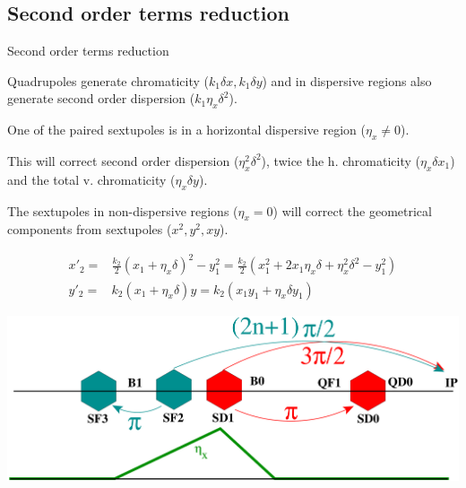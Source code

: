 \documentclass{beamer}
\begin{document}
\subsection{Second order terms reduction}
\begin{frame}{Second order terms reduction}\,
  {\scriptsize Quadrupoles generate chromaticity ($k_1 \delta x, k_1 \delta y$) and in dispersive regions also generate second order dispersion ($k_1\eta_x\delta^2$).\par
  One of the paired sextupoles is in a horizontal dispersive region ($\eta_x\neq0$).\par
  This will correct second order dispersion ($\eta_x^2\delta^2$), twice the h. chromaticity ($\eta_x\delta x_1$) and the total v. chromaticity ($\eta_x\delta y$).\par
  The sextupoles in non-dispersive regions ($\eta_x=0$) will correct the geometrical components from sextupoles ($x^2, y^2, xy$).\par
  }
  \begin{align*}
   x'_2 = & \frac{k_2}{2}(x_1+\eta_x\delta)^2-y_1^2=\frac{k_2}{2}(x_1^2+2x_1\eta_x\delta+\eta_x^2\delta^2-y_1^2)\\
   y'_2 = & k_2 (x_1+\eta_x\delta)y = k_2 (x_1y_1 +\eta_x\delta y_1)
  \end{align*}

 \includegraphics[scale=0.20,angle=0]{phase_adv.pdf}\par
\end{frame}
\end{document}
